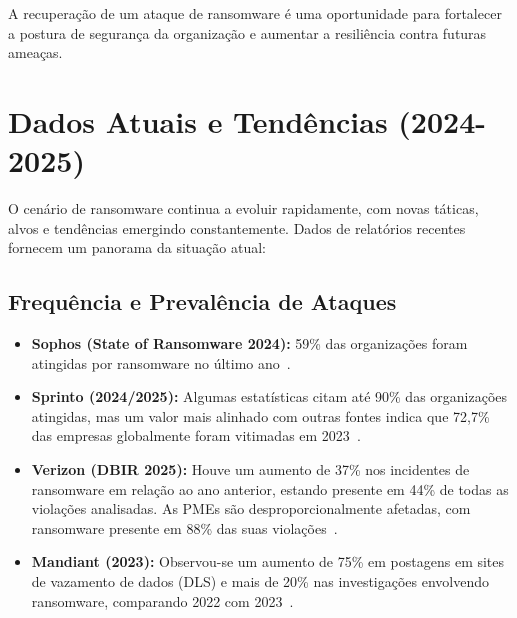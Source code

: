 A recuperação de um ataque de ransomware é uma oportunidade para fortalecer a postura de segurança da organização e aumentar a resiliência contra futuras ameaças.



\section{Dados Atuais e Tendências (2024-2025)}
O cenário de ransomware continua a evoluir rapidamente, com novas táticas, alvos e tendências emergindo constantemente. Dados de relatórios recentes fornecem um panorama da situação atual:

\subsection{Frequência e Prevalência de Ataques}
\begin{itemize}
    \item \textbf{Sophos (State of Ransomware 2024):} 59\% das organizações foram atingidas por ransomware no último ano~\cite{SophosStateOfRansomware2024}.
    \item \textbf{Sprinto (2024/2025):} Algumas estatísticas citam até 90\% das organizações atingidas, mas um valor mais alinhado com outras fontes indica que 72,7\% das empresas globalmente foram vitimadas em 2023~\cite{SprintoRansomwareStats2025}.
    \item \textbf{Verizon (DBIR 2025):} Houve um aumento de 37\% nos incidentes de ransomware em relação ao ano anterior, estando presente em 44\% de todas as violações analisadas. As PMEs são desproporcionalmente afetadas, com ransomware presente em 88\% das suas violações~\cite{VerizonDBIR2025}.
    \item \textbf{Mandiant (2023):} Observou-se um aumento de 75\% em postagens em sites de vazamento de dados (DLS) e mais de 20\% nas investigações envolvendo ransomware, comparando 2022 com 2023~\cite{MandiantGoogleCloudRansomware2023}.
\end{itemize}

